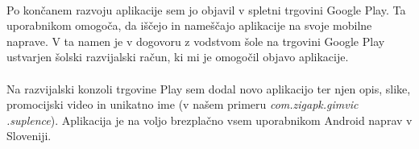 \paragraph{}Po končanem razvoju aplikacije sem jo objavil v spletni trgovini Google Play. Ta uporabnikom omogoča, da iščejo in nameščajo aplikacije na svoje mobilne naprave. V ta namen je v dogovoru z vodstvom šole na trgovini Google Play ustvarjen šolski razvijalski račun, ki mi je omogočil objavo aplikacije.

\paragraph{}Na razvijalski konzoli trgovine Play sem dodal novo aplikacijo ter njen opis, slike, promocijski video in unikatno ime (v našem primeru \textit{com.zigapk.gimvic .suplence}). Aplikacija je na voljo brezplačno vsem uporabnikom Android naprav v Sloveniji.
